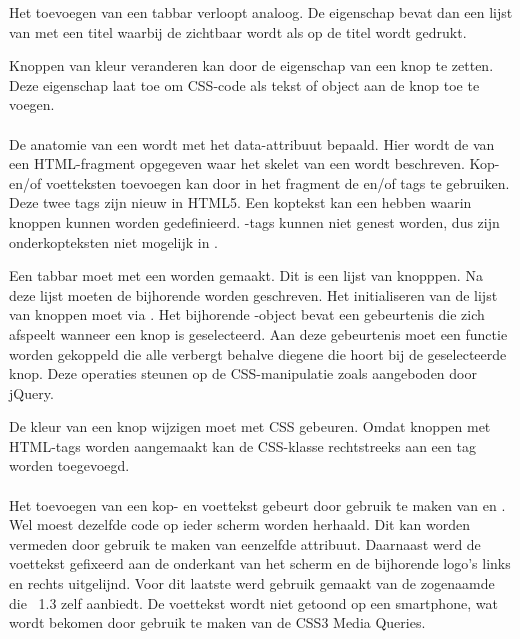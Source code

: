 Het toevoegen van een tabbar verloopt analoog.
De  eigenschap bevat dan een lijst van  met een titel waarbij de  zichtbaar wordt als op de titel wordt gedrukt.

Knoppen van kleur veranderen kan door de  eigenschap van een knop te zetten.
Deze eigenschap laat toe om CSS-code als tekst of object aan de knop toe te voegen.

\paragraph{\kendo}
De anatomie van een  wordt met het data-attribuut  bepaald.
Hier wordt de  van een HTML-fragment opgegeven waar het skelet van een  wordt beschreven.
Kop- en/of voetteksten toevoegen kan door in het fragment de  en/of  tags te gebruiken.
Deze twee tags zijn nieuw in HTML5.
Een koptekst kan een  hebben waarin knoppen kunnen worden gedefinieerd.
-tags kunnen niet genest worden, dus zijn onderkopteksten niet mogelijk in \kendo{}.

Een tabbar moet met een  worden gemaakt.
Dit is een lijst van knopppen.
Na deze lijst moeten de bijhorende  worden geschreven.
Het initialiseren van de lijst van knoppen moet via .
Het bijhorende \js-object bevat een  gebeurtenis die zich afspeelt wanneer een knop is geselecteerd.
Aan deze gebeurtenis moet een functie worden gekoppeld die alle  verbergt behalve diegene die hoort bij de geselecteerde knop.
Deze operaties steunen op de CSS-manipulatie zoals aangeboden door jQuery.

De kleur van een knop wijzigen moet met CSS gebeuren.
Omdat knoppen met HTML-tags worden aangemaakt kan de CSS-klasse rechtstreeks aan een tag worden toegevoegd.

\paragraph{\jqm}
Het toevoegen van een kop- en voettekst gebeurt door gebruik te maken van  en . 
Wel moest dezelfde code op ieder scherm worden herhaald. 
Dit kan worden vermeden door gebruik te maken van eenzelfde  attribuut. 
Daarnaast werd de voettekst gefixeerd aan de onderkant van het scherm en de bijhorende logo's links en rechts uitgelijnd. 
Voor dit laatste werd gebruik gemaakt van de zogenaamde  die \jqm{}~1.3 zelf aanbiedt. 
De voettekst wordt niet getoond op een smartphone, wat wordt bekomen door gebruik te maken van de CSS3 Media Queries.

